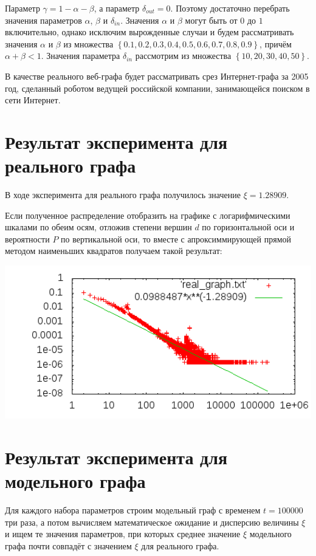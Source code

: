 \documentclass[14pt]{extreport}
\begin{document}
Параметр $\gamma = 1 - \alpha - \beta$, а параметр $\delta_{out} = 0$. Поэтому достаточно перебрать значения параметров $\alpha$, $\beta$ и $\delta_{in}$. Значения $\alpha$ и $\beta$ могут быть от $0$ до $1$ включительно, однако исключим вырожденные случаи и будем рассматривать значения $\alpha$ и $\beta$ из множества $\left\{0.1, 0.2, 0.3, 0.4, 0.5, 0.6, 0.7, 0.8, 0.9\right\}$, причём $\alpha + \beta < 1$. Значения параметра $\delta_{in}$ рассмотрим из множества $\left\{10, 20, 30, 40, 50\right\}$.

В качестве реального веб-графа будет рассматривать срез Интернет-графа за 2005 год, сделанный роботом ведущей российской компании, занимающейся поиском в сети Интернет.

\section{Результат эксперимента для реального графа}

В ходе эксперимента для реального графа получилось значение $\xi = 1.28909$.

Если полученное распределение отобразить на графике с логарифмическими шкалами по обеим осям, отложив степени вершин $d$ по горизонтальной оси и вероятности $P$ по вертикальной оси, то вместе с апроксиммирующей прямой методом наименьших квадратов получаем такой результат:

\includegraphics[width=160mm]{code/real_graph.png}

\section{Результат эксперимента для модельного графа}

Для каждого набора параметров строим модельный граф с временем $t = 100000$ три раза, а потом вычисляем математическое ожидание и дисперсию величины $\xi$ и ищем те значения параметров, при которых среднее значение $\xi$ модельного графа почти совпадёт с значением $\xi$ для реального графа.
\end{document}
